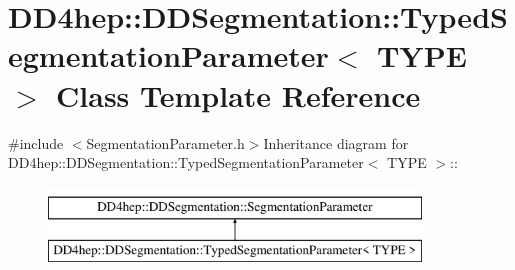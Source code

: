 \hypertarget{class_d_d4hep_1_1_d_d_segmentation_1_1_typed_segmentation_parameter}{
\section{DD4hep::DDSegmentation::TypedSegmentationParameter$<$ TYPE $>$ Class Template Reference}
\label{class_d_d4hep_1_1_d_d_segmentation_1_1_typed_segmentation_parameter}
}


{\ttfamily \#include $<$SegmentationParameter.h$>$}Inheritance diagram for DD4hep::DDSegmentation::TypedSegmentationParameter$<$ TYPE $>$::\begin{figure}[H]
\begin{center}
\leavevmode
\includegraphics[height=2cm]{class_d_d4hep_1_1_d_d_segmentation_1_1_typed_segmentation_parameter}
\end{center}
\end{figure}
